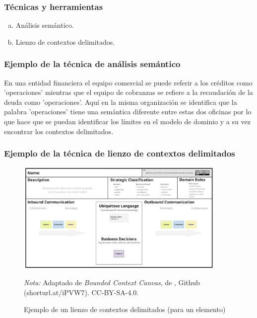 \subsubsection*{Técnicas y herramientas}
\begin{enumerate}[a.]
	\item Análisis semántico.
  \item Lienzo de contextos delimitados.
\end{enumerate}

\subsubsection*{Ejemplo de la técnica de análisis semántico}

En una entidad financiera el equipo comercial se puede referir a los créditos 
como 'operaciones' mientras que el equipo de cobranzas se refiere a la recaudación de la deuda como 'operaciones'.
Aquí en la misma organización se identifica que la palabra 'operaciones' tiene una semántica diferente entre
estas dos oficinas por lo que hace que se puedan identificar los límites en el modelo de dominio y a su vez 
encontrar los contextos delimitados.


\subsubsection*{Ejemplo de la técnica de lienzo de contextos delimitados}
\vspace{1em}

  \begin{figure}[H]
    \caption{Ejemplo de un lienzo de contextos delimitados (para un elemento)}
    \begin{center}
    \includegraphics[width=0.90\textwidth]{src/assets/metodologia/bounded_context_canvas}
    \label{fig:bounded_context_canvas}
    \end{center}
    \textit{Nota:} Adaptado de \textit{Bounded Context Canvas}, de \cite{canvas}, Github (shorturl.at/iPVW7). CC-BY-SA-4.0.
  \end{figure}

